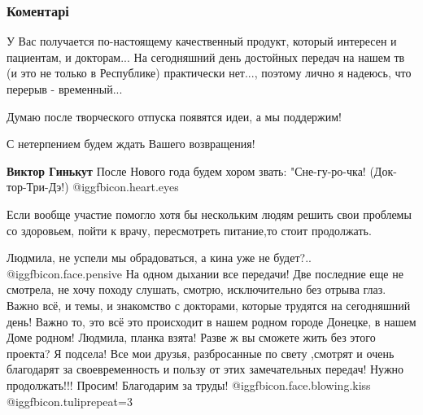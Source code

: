  
 
 
 
 
\subsubsection{Коментарі}

\begin{itemize} %

У Вас получается по-настоящему качественный продукт, который интересен и
пациентам, и докторам... На сегодняшний день достойных передач на нашем тв (и
это не только в Республике) практически нет..., поэтому лично я надеюсь, что
перерыв - временный...

Думаю после творческого отпуска появятся идеи, а мы поддержим!



С нетерпением будем ждать Вашего возвращения!

\begin{itemize} %
\textbf{Виктор Гинькут} После Нового года будем хором звать: "Сне-гу-ро-чка! (Док-тор-Три-Дэ!)  @igg{fbicon.heart.eyes} 
\end{itemize} %

Если вообще участие помогло хотя бы нескольким людям решить свои проблемы со здоровьем, пойти к врачу, пересмотреть питание,то стоит продолжать.


Людмила, не успели мы обрадоваться, а кина уже не будет?..  @igg{fbicon.face.pensive}  На одном дыхании
все передачи! Две последние еще не смотрела, не хочу походу слушать, смотрю,
исключительно без отрыва глаз. Важно всё, и темы, и знакомство с докторами,
которые трудятся на сегодняшний день! Важно то, это всё это происходит в нашем
родном городе Донецке, в нашем Доме родном! Людмила, планка взята! Разве ж вы
сможете жить без этого проекта? Я подсела! Все мои друзья, разбросанные по
свету ,смотрят и очень благодарят за своевременность и пользу от этих
замечательных передач! Нужно продолжать!!! Просим! Благодарим за труды!
 @igg{fbicon.face.blowing.kiss}  @igg{fbicon.tulip}{repeat=3} 


\end{itemize}
